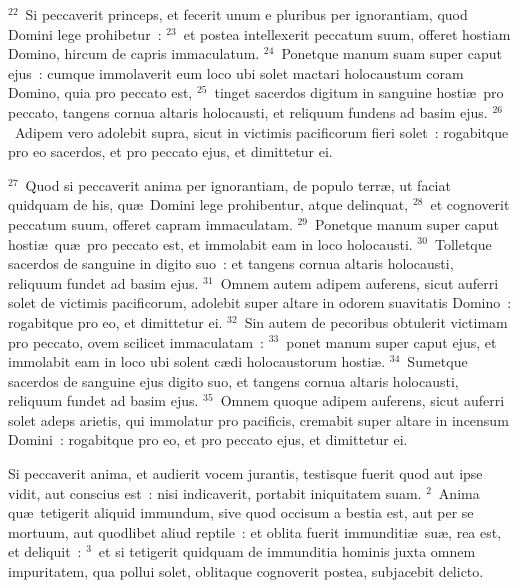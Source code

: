 ${}^{22}$~Si peccaverit princeps, et fecerit unum e pluribus per ignorantiam, quod Domini lege prohibetur~:
${}^{23}$~et postea intellexerit peccatum suum, offeret hostiam Domino, hircum de capris immaculatum.
${}^{24}$~Ponetque manum suam super caput ejus~: cumque immolaverit eum loco ubi solet mactari holocaustum coram Domino, quia pro peccato est,
${}^{25}$~tinget sacerdos digitum in sanguine hosti\ae\ pro peccato, tangens cornua altaris holocausti, et reliquum fundens ad basim ejus.
${}^{26}$~Adipem vero adolebit supra, sicut in victimis pacificorum fieri solet~: rogabitque pro eo sacerdos, et pro peccato ejus, et dimittetur ei.


${}^{27}$~Quod si peccaverit anima per ignorantiam, de populo terr\ae , ut faciat quidquam de his, qu\ae\ Domini lege prohibentur, atque delinquat,
${}^{28}$~et cognoverit peccatum suum, offeret capram immaculatam.
${}^{29}$~Ponetque manum super caput hosti\ae\ qu\ae\ pro peccato est, et immolabit eam in loco holocausti.
${}^{30}$~Tolletque sacerdos de sanguine in digito suo~: et tangens cornua altaris holocausti, reliquum fundet ad basim ejus.
${}^{31}$~Omnem autem adipem auferens, sicut auferri solet de victimis pacificorum, adolebit super altare in odorem suavitatis Domino~: rogabitque pro eo, et dimittetur ei.
${}^{32}$~Sin autem de pecoribus obtulerit victimam pro peccato, ovem scilicet immaculatam~:
${}^{33}$~ponet manum super caput ejus, et immolabit eam in loco ubi solent c\ae di holocaustorum hosti\ae .
${}^{34}$~Sumetque sacerdos de sanguine ejus digito suo, et tangens cornua altaris holocausti, reliquum fundet ad basim ejus.
${}^{35}$~Omnem quoque adipem auferens, sicut auferri solet adeps arietis, qui immolatur pro pacificis, cremabit super altare in incensum Domini~: rogabitque pro eo, et pro peccato ejus, et dimittetur ei.

\lettrine[lines=3,image=true,loversize=0.05,lraise=-0.03]{S}{}i peccaverit anima, et audierit vocem jurantis, testisque fuerit quod aut ipse vidit, aut conscius est~: nisi indicaverit, portabit iniquitatem suam.
${}^{2}$~Anima qu\ae\ tetigerit aliquid immundum, sive quod occisum a bestia est, aut per se mortuum, aut quodlibet aliud reptile~: et oblita fuerit immunditi\ae\ su\ae , rea est, et deliquit~:
${}^{3}$~et si tetigerit quidquam de immunditia hominis juxta omnem impuritatem, qua pollui solet, oblitaque cognoverit postea, subjacebit delicto.


